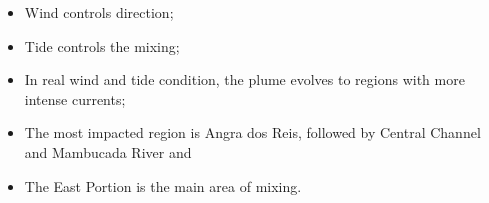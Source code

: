 \documentclass[final]{beamer}
\begin{document}
\begin{frame}
\begin{multicols}{2}
\begin{itemize}
	\item Wind controls direction;
	\item Tide controls the mixing;
	\item In real wind and tide condition, the plume evolves to regions with more intense currents;
	\item The most impacted region is Angra dos Reis, followed by Central Channel and 
	Mambucada River and
	\item The East Portion is the main area of mixing.
\end{itemize}

\end{multicols}

\end{frame}
\end{document}

